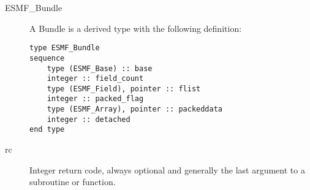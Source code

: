 

\begin{description}

\item [ESMF\_Bundle] A Bundle is a derived type with the following definition:
\begin{verbatim}
type ESMF_Bundle
sequence
    type (ESMF_Base) :: base
    integer :: field_count
    type (ESMF_Field), pointer :: flist
    integer :: packed_flag
    type (ESMF_Array), pointer :: packeddata
    integer :: detached
end type
\end{verbatim}

\item [rc] Integer return code, always optional and generally the last argument to a subroutine or function.

\end{description}






